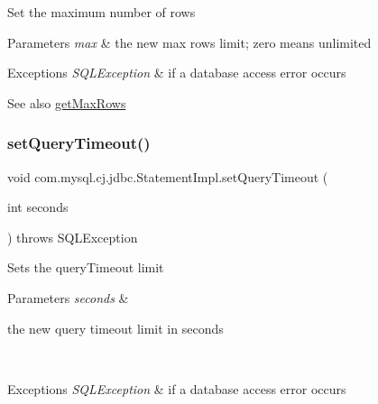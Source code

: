 Set the maximum number of rows


\begin{DoxyParams}{Parameters}
{\em max} & the new max rows limit; zero means unlimited\\
\hline
\end{DoxyParams}

\begin{DoxyExceptions}{Exceptions}
{\em S\+Q\+L\+Exception} & if a database access error occurs\\
\hline
\end{DoxyExceptions}
\begin{DoxySeeAlso}{See also}
\mbox{\hyperlink{classcom_1_1mysql_1_1cj_1_1jdbc_1_1_statement_impl_ae2447bc18fbb4aba8ef64f48f0c90c36}{get\+Max\+Rows}} 
\end{DoxySeeAlso}
\mbox{\label{classcom_1_1mysql_1_1cj_1_1jdbc_1_1_statement_impl_a4bc4a551083ec1e3a3cabcea2da922ad}} 
\subsubsection{\texorpdfstring{set\+Query\+Timeout()}{setQueryTimeout()}}
{\footnotesize\ttfamily void com.\+mysql.\+cj.\+jdbc.\+Statement\+Impl.\+set\+Query\+Timeout (\begin{DoxyParamCaption}\item[{int}]{seconds }\end{DoxyParamCaption}) throws S\+Q\+L\+Exception}

Sets the query\+Timeout limit


\begin{DoxyParams}{Parameters}
{\em seconds} & 
\begin{DoxyItemize}
\item the new query timeout limit in seconds
\end{DoxyItemize}\\
\hline
\end{DoxyParams}

\begin{DoxyExceptions}{Exceptions}
{\em S\+Q\+L\+Exception} & if a database access error occurs \\
\hline
\end{DoxyExceptions}
\mbox{\label{classcom_1_1mysql_1_1cj_1_1jdbc_1_1_statement_impl_a04f28c7dc2d7b2c20ae6fad4301dd8fc}} 
